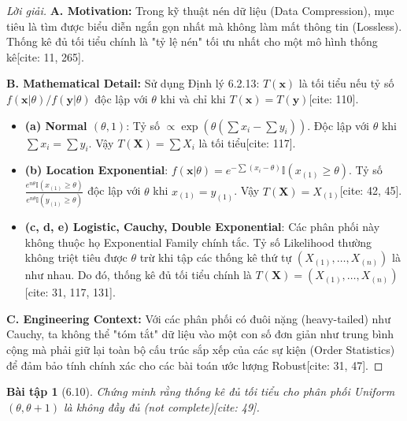 \documentclass[8pt,a4paper]{article}
\newtheorem{exercise}{Bài tập}
\newenvironment{solution}{\begin{proof}[Lời giải]}{\end{proof}}
\begin{document}
\begin{solution}
\textbf{A. Motivation:} Trong kỹ thuật nén dữ liệu (Data Compression), mục tiêu là tìm được biểu diễn ngắn gọn nhất mà không làm mất thông tin (Lossless). Thống kê đủ tối tiểu chính là "tỷ lệ nén" tối ưu nhất cho một mô hình thống kê[cite: 11, 265].

\textbf{B. Mathematical Detail:}
Sử dụng Định lý 6.2.13: $T(\mathbf{x})$ là tối tiểu nếu tỷ số $f(\mathbf{x}|\theta)/f(\mathbf{y}|\theta)$ độc lập với $\theta$ khi và chỉ khi $T(\mathbf{x}) = T(\mathbf{y})$[cite: 110].

\begin{itemize}
    \item \textbf{(a) Normal $(\theta, 1)$}: Tỷ số $\propto \exp(\theta(\sum x_i - \sum y_i))$. Độc lập với $\theta$ khi $\sum x_i = \sum y_i$. Vậy $T(\mathbf{X}) = \sum X_i$ là tối tiểu[cite: 117].
    \item \textbf{(b) Location Exponential}: $f(\mathbf{x}|\theta) = e^{-\sum (x_i - \theta)} \mathbb{I}(x_{(1)} \ge \theta)$. Tỷ số $\frac{e^{n\theta} \mathbb{I}(x_{(1)} \ge \theta)}{e^{n\theta} \mathbb{I}(y_{(1)} \ge \theta)}$ độc lập với $\theta$ khi $x_{(1)} = y_{(1)}$. Vậy $T(\mathbf{X}) = X_{(1)}$[cite: 42, 45].
    \item \textbf{(c, d, e) Logistic, Cauchy, Double Exponential}: Các phân phối này không thuộc họ Exponential Family chính tắc. Tỷ số Likelihood thường không triệt tiêu được $\theta$ trừ khi tập các thống kê thứ tự $(X_{(1)}, \dots, X_{(n)})$ là như nhau. Do đó, thống kê đủ tối tiểu chính là $T(\mathbf{X}) = (X_{(1)}, \dots, X_{(n)})$[cite: 31, 117, 131].
\end{itemize}

\textbf{C. Engineering Context:} Với các phân phối có đuôi nặng (heavy-tailed) như Cauchy, ta không thể "tóm tắt" dữ liệu vào một con số đơn giản như trung bình cộng mà phải giữ lại toàn bộ cấu trúc sắp xếp của các sự kiện (Order Statistics) để đảm bảo tính chính xác cho các bài toán ước lượng Robust[cite: 31, 47].
\end{solution}

\begin{exercise}[6.10]
Chứng minh rằng thống kê đủ tối tiểu cho phân phối Uniform $(\theta, \theta+1)$ là không đầy đủ (not complete)[cite: 49].
\end{exercise}
\end{document}
